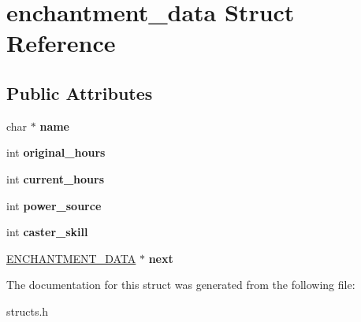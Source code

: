 \hypertarget{structenchantment__data}{\section{enchantment\-\_\-data Struct Reference}
\label{structenchantment__data}
}
\subsection*{Public Attributes}
\begin{DoxyCompactItemize}
\item 
\hypertarget{structenchantment__data_af03b010122f085b92d78729eac4cd7de}{char $\ast$ {\bfseries name}}\label{structenchantment__data_af03b010122f085b92d78729eac4cd7de}

\item 
\hypertarget{structenchantment__data_a3fba0b973cc533ed7c22ba02e8c98b89}{int {\bfseries original\-\_\-hours}}\label{structenchantment__data_a3fba0b973cc533ed7c22ba02e8c98b89}

\item 
\hypertarget{structenchantment__data_a81fcc08acaecc08801af4303e4ced67c}{int {\bfseries current\-\_\-hours}}\label{structenchantment__data_a81fcc08acaecc08801af4303e4ced67c}

\item 
\hypertarget{structenchantment__data_a119a19212a52d59675a3f7ea6b886acf}{int {\bfseries power\-\_\-source}}\label{structenchantment__data_a119a19212a52d59675a3f7ea6b886acf}

\item 
\hypertarget{structenchantment__data_af49f2d70325ad808a5ce5f2e42395c19}{int {\bfseries caster\-\_\-skill}}\label{structenchantment__data_af49f2d70325ad808a5ce5f2e42395c19}

\item 
\hypertarget{structenchantment__data_a45b41ecaa85d8cc46da17279e48ed8e1}{\hyperlink{structenchantment__data}{E\-N\-C\-H\-A\-N\-T\-M\-E\-N\-T\-\_\-\-D\-A\-T\-A} $\ast$ {\bfseries next}}\label{structenchantment__data_a45b41ecaa85d8cc46da17279e48ed8e1}

\end{DoxyCompactItemize}


The documentation for this struct was generated from the following file\-:\begin{DoxyCompactItemize}
\item 
structs.\-h\end{DoxyCompactItemize}
